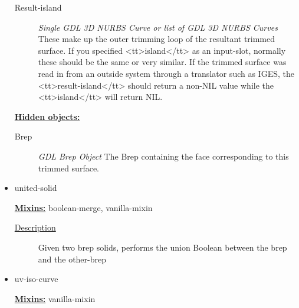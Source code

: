 \documentclass [11pt]{book}
\begin{document}
\begin{itemize}
\begin{description}
\item [Result-island]
\emph{Single GDL 3D NURBS Curve or list of GDL 3D NURBS Curves} These make up the outer trimming loop of the resultant
trimmed surface. If you specified <tt>island</tt> as an input-slot, normally these should be the same
or very similar. If the trimmed surface was read in from an outside system through a translator such as IGES,
the <tt>result-island</tt> should return a non-NIL value while the <tt>island</tt> will return NIL.


\end{description}






\textbf{
\underline{Hidden objects:}}

\begin{description}

\item [Brep]
\emph{GDL Brep Object} The Brep containing the face corresponding to this trimmed surface.


\end{description}







\item {}united-solid


\textbf{
\underline{Mixins:}} boolean-merge, vanilla-mixin





\begin{description}

\item [
\underline{Description}]


Given two brep solids, performs the union Boolean between the brep and the other-brep



\end{description}









\item {}uv-iso-curve


\textbf{
\underline{Mixins:}} vanilla-mixin






\end{itemize}
\end{document}
